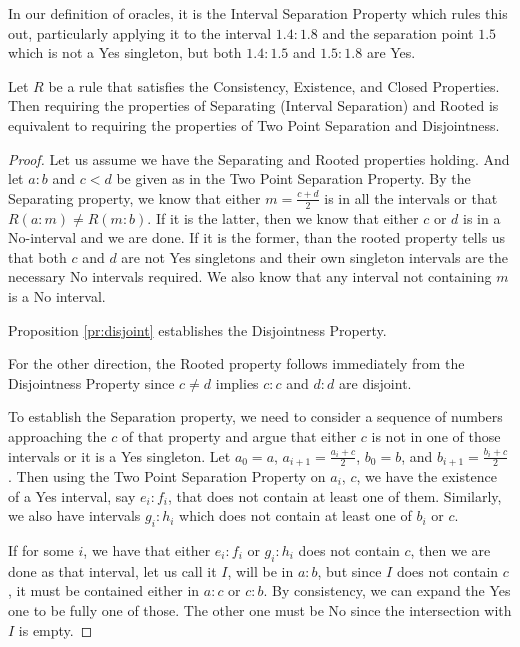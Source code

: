 \documentclass[12pt]{article}
\begin{document}
In our definition of oracles, it is the Interval Separation Property which rules this out, particularly applying it to the interval $1.4:1.8$ and the separation point $1.5$ which is not a Yes singleton, but both $1.4:1.5$ and $1.5:1.8$ are Yes. 

\begin{proposition}
    Let $R$ be a rule that satisfies the Consistency, Existence, and Closed Properties. Then requiring the properties of Separating (Interval Separation) and Rooted is equivalent to requiring the properties of Two Point Separation and Disjointness. 
\end{proposition}

\begin{proof}
    Let us assume we have the Separating and Rooted properties holding. And let $a:b$ and $c < d$ be given as in the Two Point Separation Property. By the Separating property, we know that either $m =\frac{c+d}{2}$ is in all the intervals or that $R(a:m) \neq R(m:b)$. If it is the latter, then we know that either $c$ or $d$ is in a No-interval and we are done. If it is the former, than the rooted property tells us that both $c$ and $d$ are not Yes singletons and their own singleton intervals are the necessary No intervals required. We also know that any interval not containing $m$ is a No interval. 
    
    Proposition \ref{pr:disjoint} establishes the Disjointness Property. 

    For the other direction, the Rooted property follows immediately from the Disjointness Property since $c \neq d$ implies $c:c$ and $d:d$ are disjoint. 
    
    To establish the Separation property, we need to consider a sequence of numbers approaching the $c$ of that property and argue that either $c$ is not in one of those intervals or it is a Yes singleton. Let $a_0=a$, $a_{i+1} = \frac{a_i + c}{2}$, $b_0 = b$, and $b_{i+1} = \frac{b_i + c}{2}$. Then using the Two Point Separation Property on $a_i$, $c$, we have the existence of a Yes interval, say $e_i:f_i$, that does not contain at least one of them. Similarly, we also have intervals $g_i:h_i$ which does not contain at least one of $b_i$ or $c$. 
    
    If for some $i$,  we have that either $e_i:f_i$ or $g_i:h_i$ does not contain $c$, then we are done as that interval, let us call it $I$,  will be in $a:b$, but since $I$ does not contain $c$, it must be contained either in $a:c$ or $c:b$. By consistency, we can expand the Yes one to be fully one of those. The other one must be No since the intersection with $I$ is empty. 
    

\end{proof}
\end{document}
